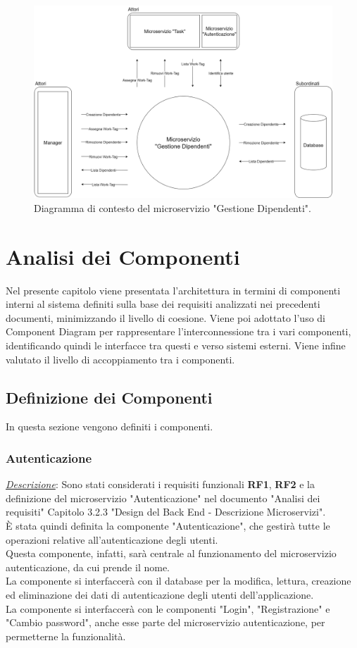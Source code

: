 \documentclass{report}
\begin{document}
\begin{figure}[H]
	\centering\includegraphics[width=1\textwidth]{images/Diagrammi_Contesto/Diagramma_Contesto_Dipendenti.png}
	Diagramma di contesto del microservizio "Gestione Dipendenti".
\end{figure}

\chapter{Analisi dei Componenti}
Nel presente capitolo viene presentata l’architettura in termini di componenti interni al sistema definiti sulla base dei requisiti analizzati nei precedenti documenti, minimizzando il livello di coesione. Viene poi adottato l’uso di Component Diagram per rappresentare l’interconnessione tra i vari componenti, identificando quindi le interfacce tra questi e verso sistemi esterni. Viene infine valutato il livello di accoppiamento tra i componenti.


\section{Definizione dei Componenti}
In questa sezione vengono definiti i componenti.

\subsection*{Autenticazione}
\uline{\textit{Descrizione}}: 
Sono stati considerati i requisiti funzionali \textbf{RF1}, \textbf{RF2} e la definizione del microservizio "Autenticazione" nel documento "Analisi dei requisiti"
Capitolo 3.2.3 "Design del Back End - Descrizione Microservizi".\\
È stata quindi definita la componente "Autenticazione", che gestirà tutte le operazioni relative all'autenticazione degli utenti.\\
Questa componente, infatti, sarà centrale al funzionamento del microservizio autenticazione, da cui prende il nome.\\
La componente si interfaccerà  con il database per la modifica, lettura, creazione ed eliminazione dei dati di autenticazione degli utenti dell'applicazione.\\
La componente si interfaccerà con le componenti "Login", "Registrazione" e "Cambio password", anche esse parte del microservizio autenticazione, per permetterne la funzionalità.\\
\end{document}
